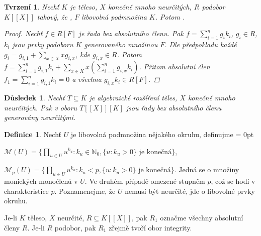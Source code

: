 \documentclass[11pt,a4paper]{article}
\newcommand\m[1]{\mathbb { #1 }} %
\newcommand\p[1]{\mathcal{ #1 }} %
\newcommand\N{\m N}
\newenvironment{items}{%
	\itemize
	\itemsep = 0pt%
}{%
	\enditemize
}
\newcounter{numb}
\theoremstyle{definition}
\newtheorem*{definice}{Definice}
\theoremstyle{plain}
\newtheorem{tvrzeni}[numb]{Tvrzení}
\newtheorem{dusledek}[numb]{Důsledek}
\begin{document}
\begin{tvrzeni} \label{thm:RF_absOK}
	Nechť $K$ je těleso, $X$ konečně mnoho neurčitých, $R$ podobor $K[[X]]$ takový, že , $F$ libovolná podmnožina $K$. Potom .
	
	\begin{proof}
		\newcommand{\I}{_{i = 1}^n}
		
		Nechť $f \in R[F]$ je řada bez absolutního členu. Pak $f = \sum\I g_i k_i$, $g_i \in R$, $k_i$ jsou prvky podoboru $K$ generovaného množinou $F$. Dle předpokladu každé $g_i = g_{i, 1} + \sum_{x \in X} x g_{i, x}$, kde $g_{i, x} \in R$. Potom $f = \sum\I g_{i, 1} k_i + \sum_{x \in X} x (\sum\I g_{i, x} k_i)$. Přitom absolutní člen $f_1 = \sum\I g_{i, 1} k_i = 0$ a všechna $g_{i, x} k_i \in R[F]$.
	\end{proof}
\end{tvrzeni}

\begin{dusledek} \label{thm:TXK_absOK}
	Nechť $T \subseteq K$ je algebraické rozšíření těles, $X$ konečně mnoho neurčitých. Pak v oboru $T[[X]][K]$ jsou řady bez absolutního členu generovány neurčitými.
\end{dusledek}

\begin{definice}
	Nechť $U$ je libovolná podmnožina nějakého okruhu, definujme
	\begin{items}
		\item $\p M(U) = \{\prod_{u \in U} u^{k_u}: k_u \in \N_0, \{u: k_u > 0\} \text{ je konečná}\}$,
		\item $\p M_p(U) = \{\prod_{u \in U} u^{k_u}: k_u < p, \{u: k_u > 0\} \text{ je konečná}\}$.
	\end{items}
	Jedná se o množiny monických monočlenů v $U$. Ve druhém případě omezené stupněm $p$, což se hodí v charakteristice $p$. Poznamenejme, že $U$ nemusí být neurčité, jde o libovolné prvky okruhu.
	
	Je-li $K$ těleso, $X$ neurčité, $R \subseteq K[[X]]$, pak $R_1$ označme všechny absolutní členy $R$. Je-li $R$ podobor, pak $R_1$ zřejmě tvoří obor integrity.
\end{definice}
\end{document}
